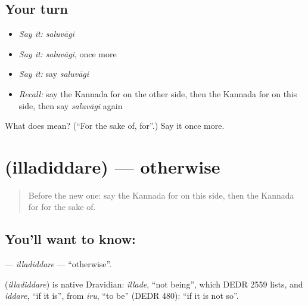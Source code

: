 \subsection*{Your turn}
\begin{itemize}
\raggedright
  \item \emph{Say it:} \emph{saluvāgi}
  \item \emph{Say it:} \emph{saluvāgi}, once more
  \item \emph{Say it:} say \emph{saluvāgi}
  \item \emph{Recall:} say the Kannada for on the other side, then the Kannada for on this side, then say \emph{saluvāgi} again
\end{itemize}

\begin{tcolorbox}[breakable,colback=teal!4,colframe=teal!35!black,title={Before you move on}]
What does  mean? (\textquotedblleft{}For the sake of, for\textquotedblright{}.) Say it once more.
\end{tcolorbox}
\section[\texorpdfstring{\kn{ಇಲ್ಲದಿದ್ದರೆ} (illadiddare)}{ಇಲ್ಲದಿದ್ದರೆ (illadiddare)}]{ (illadiddare) — otherwise}

\label{lesson:KA-C176-illadiddare}



\begin{quote}
Before the new one: say the Kannada for on this side, then the Kannada for for the sake of.
\end{quote}

\subsection*{You'll want to know: }
\textbf{} — \emph{illadiddare} — \textquotedblleft{}otherwise\textquotedblright{}.

\begin{cousinweb}
\textbf{} (\emph{illadiddare}) is native Dravidian: \emph{illade}, \textquotedblleft{}not being\textquotedblright{}, which DEDR 2559 lists, and \emph{iddare}, \textquotedblleft{}if it is\textquotedblright{}, from \emph{iru}, \textquotedblleft{}to be\textquotedblright{} (DEDR 480): \textquotedblleft{}if it is not so\textquotedblright{}.
\end{cousinweb}

